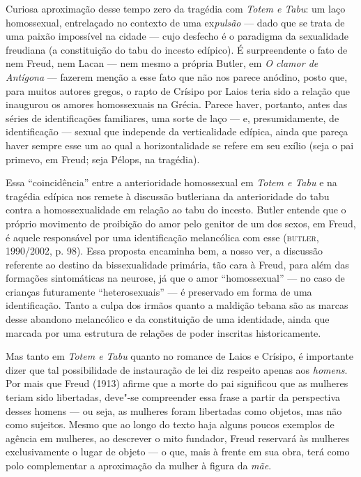 Curiosa aproximação desse tempo zero da tragédia com \emph{Totem e Tabu}:
um laço homossexual, entrelaçado no contexto de uma ex\emph{pulsão} ---
dado que se trata de uma paixão impossível na cidade --- cujo desfecho é
o paradigma da sexualidade freudiana (a constituição do tabu do incesto
edípico). É surpreendente o fato de nem Freud, nem Lacan --- nem mesmo a
própria Butler, em \emph{O clamor de Antígona} --- fazerem menção a esse
fato que não nos parece anódino, posto que, para muitos autores gregos,
o rapto de Crísipo por Laios teria sido a relação que inaugurou os
amores homossexuais na Grécia. Parece haver, portanto, antes das séries
de identificações familiares, uma sorte de laço --- e, presumidamente,
de identificação --- sexual que independe da verticalidade edípica,
ainda que pareça haver sempre esse um ao qual a horizontalidade se
refere em seu exílio (seja o pai primevo, em Freud; seja Pélops, na
tragédia).

Essa ``coincidência'' entre a anterioridade homossexual em \emph{Totem e
Tabu} e na tragédia edípica nos remete à discussão butleriana da
anterioridade do tabu contra a homossexualidade em relação ao tabu do
incesto. Butler entende que o próprio movimento de proibição do amor
pelo genitor de um dos sexos, em Freud, é aquele responsável por uma
identificação melancólica com esse (\textsc{butler}, 1990/2002, p. 98). Essa
proposta encaminha bem, a nosso ver, a discussão referente ao destino da
bissexualidade primária, tão cara à Freud, para além das formações
sintomáticas na neurose, já que o amor ``homossexual'' --- no caso de
crianças futuramente ``heterosexuais'' --- é preservado em forma de uma
identificação. Tanto a culpa dos irmãos quanto a maldição tebana são as
marcas desse abandono melancólico e da constituição de uma identidade,
ainda que marcada por uma estrutura de relações de poder inscritas
historicamente.

Mas tanto em \emph{Totem e Tabu} quanto no romance de Laios e Crísipo, é
importante dizer que tal possibilidade de instauração de lei diz
respeito apenas aos \emph{homens}. Por mais que Freud (1913) afirme que
a morte do pai significou que as mulheres teriam sido libertadas,
deve"-se compreender essa frase a partir da perspectiva desses homens ---
ou seja, as mulheres foram libertadas como objetos, mas não como
sujeitos. Mesmo que ao longo do texto haja alguns poucos exemplos de
agência em mulheres, ao descrever o mito fundador, Freud reservará às
mulheres exclusivamente o lugar de objeto --- o que, mais à frente em
sua obra, terá como polo complementar a aproximação da mulher à figura
da \emph{mãe}.

